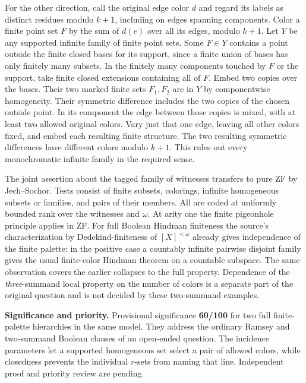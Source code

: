 \documentclass[11pt]{article}
\begin{document}
For the other direction, call the original edge color \(d\) and regard its labels as distinct residues modulo \(k+1\), including on edges spanning components. Color a finite point set \(F\) by the sum of \(d(e)\) over all its edges, modulo \(k+1\). Let \(Y\) be any supported infinite family of finite point sets. Some \(F\in Y\) contains a point outside the finite closed bases for its support, since a finite union of bases has only finitely many subsets. In the finitely many components touched by \(F\) or the support, take finite closed extensions containing all of \(F\). Embed two copies over the bases. Their two marked finite sets \(F_1,F_2\) are in \(Y\) by componentwise homogeneity. Their symmetric difference includes the two copies of the chosen outside point. In its component the edge between those copies is mixed, with at least two allowed original colors. Vary just that one edge, leaving all other colors fixed, and embed each resulting finite structure. The two resulting symmetric differences have different colors modulo \(k+1\). This rules out every monochromatic infinite family in the required sense.

The joint assertion about the tagged family of witnesses transfers to pure ZF by Jech--Sochor. Tests consist of finite subsets, colorings, infinite homogeneous subsets or families, and pairs of their members. All are coded at uniformly bounded rank over the witnesses and \(\omega\). At arity one the finite pigeonhole principle applies in ZF. For full Boolean Hindman finiteness the source's characterization by Dedekind-finiteness of \([X]^{<\omega}\) already gives independence of the finite palette: in the positive case a countably infinite pairwise disjoint family gives the usual finite-color Hindman theorem on a countable subspace. The same observation covers the earlier collapses to the full property. Dependence of the \emph{three}-summand local property on the number of colors is a separate part of the original question and is not decided by these two-summand examples.

\textbf{Significance and priority.} Provisional significance \textbf{60/100} for two full finite-palette hierarchies in the same model. They address the ordinary Ramsey and two-summand Boolean clauses of an open-ended question. The incidence parameters let a supported homogeneous set select a pair of allowed colors, while closedness prevents the individual \(r\)-sets from naming that line. Independent proof and priority review are pending.
\end{document}
